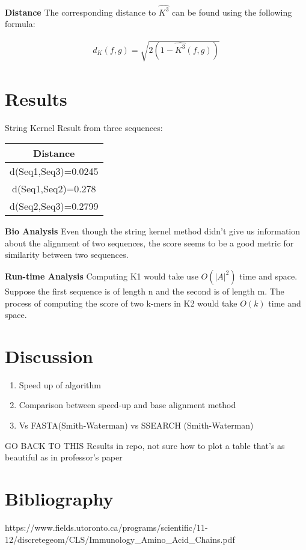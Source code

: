 \documentclass{article}
\begin{document}
\textbf{Distance}
The corresponding distance to $\hat{K^3}$ can be found using the following formula:
\begin{center}
\begin{align*} 
    d_{K}(f,g) = \sqrt{2(1-\hat{K^3}(f,g))}
    \end{align*}
\end{center}

\section{Results}
String Kernel Result from three sequences:
\begin{center}
\begin{tabular}{ |c|} \hline
Distance            \\ \hline
d(Seq1,Seq3)=0.0245 \\ \hline
d(Seq1,Seq2)=0.278  \\ \hline
d(Seq2,Seq3)=0.2799 \\ \hline
\end{tabular}
\end{center}

\par
\textbf{Bio Analysis}
Even though the string kernel method didn’t give us information about the alignment of two sequences, the score seems to be a good metric for similarity between two sequences.

\textbf{Run-time Analysis}
Computing K1 would take use $O(|A|^2)$ time and space. Suppose the first sequence is of length n and the second is of length m. The process of computing the score of two k-mers in K2 would take $O(k)$ time and space. 

\section{Discussion}
\begin{enumerate}
    \item Speed up of algorithm
    \item Comparison between speed-up and base alignment method
    \item Vs FASTA(Smith-Waterman) vs SSEARCH (Smith-Waterman)
\end{enumerate}
GO BACK TO THIS
Results in repo, not sure how to plot a table that’s as beautiful as in professor’s paper


\section{Bibliography}
https://www.fields.utoronto.ca/programs/scientific/11-12/discretegeom/CLS/Immunology_Amino_Acid_Chains.pdf
\end{document}
